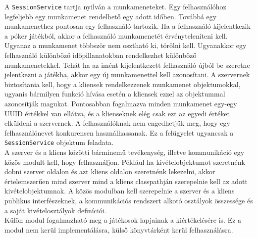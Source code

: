 A \texttt{SessionService} tartja nyilván a munkameneteket. Egy felhasználóhoz legfeljebb egy munkamenet rendelhető egy adott időben. Továbbá egy munkamenethez pontosan egy felhasználó tartozik. Ha a felhasználó kijelentkezik a póker játékból, akkor a felhasználó munkamenetét érvényteleníteni kell. Ugyanaz a munkamenet többször nem osztható ki, törölni kell. Ugyanakkor egy felhasználó különböző időpillanatokban rendelkezhet különböző munkamenetekkel. Tehát ha az imént kijelentkezett felhasználó újból be szeretne jelentkezni a játékba, akkor egy új munkamenettel kell azonosítani. A szervernek biztosítania kell, hogy a kliensek rendelkezzenek munkamenet objektumokkal, ugyanis bármilyen funkció hívása esetén a kliensek ezzel az objektummal azonosítják magukat. Pontosabban fogalmazva minden munkamenet egy-egy UUID értékkel van ellátva, és a klienseknek elég csak ezt az egyedi értéket elküldeni a szervernek. A felhasználóknak nem engedhetjük meg, hogy egy felhasználónevet konkurensen használhassanak. Ez a felügyelet ugyancsak a \texttt{SessionService} objektum feladata. \\
A szerver és a kliens közötti bárminemű tevékenység, illetve kommunikáció egy közös modult kell, hogy felhasználjon. Például ha kivételobjektumot szeretnénk dobni szerver oldalon és azt kliens oldalon szeretnénk lekezelni, akkor értelemszerűen mind szerver mind a kliens classpathján szerepelnie kell az adott kivételobjektumnak. A közös modulban kell szerepelnie a szerver és a kliens publikus interfészeknek, a kommunikációs rendszert alkotó osztályok összessége és a saját kivételosztályok definíciói. \\
Külön modul fogalmazható meg a játékosok lapjainak a kiértékelésére is. Ez a modul nem kerül implementálásra, külső könyvtárként kerül felhasználásra.

